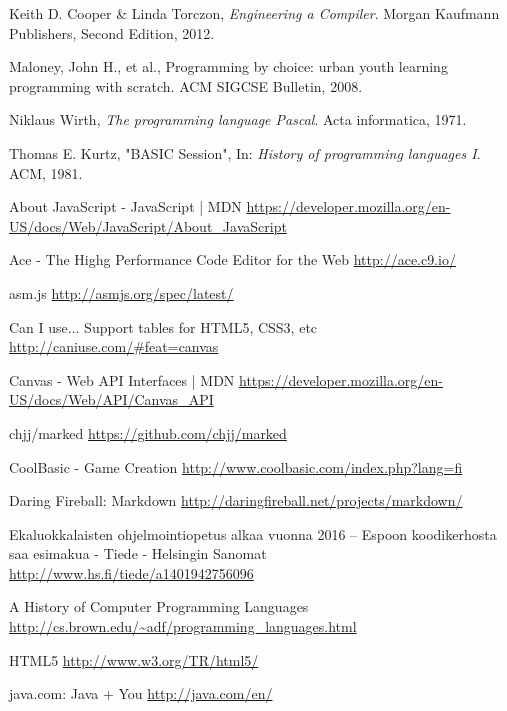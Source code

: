 
\begin{thebibliography}{99}

	Keith D. Cooper \& Linda Torczon,
	\emph{Engineering a Compiler}.
	Morgan Kaufmann Publishers,
	Second Edition,
	2012.

	Maloney, John H., et al.,
	Programming by choice: urban youth learning programming with scratch.
	ACM SIGCSE Bulletin,
	2008.
	
	Niklaus Wirth,
	\emph{The programming language Pascal}.
	Acta informatica,
	1971.

	Thomas E. Kurtz,
	"BASIC Session",
	In: \emph{History of programming languages I}.
	ACM,
	1981.

	
	About JavaScript - JavaScript | MDN \url{https://developer.mozilla.org/en-US/docs/Web/JavaScript/About_JavaScript}
	
	Ace - The Highg Performance Code Editor for the Web \url{http://ace.c9.io/}

	asm.js \url{http://asmjs.org/spec/latest/}
	
	Can I use... Support tables for HTML5, CSS3, etc \url{http://caniuse.com/#feat=canvas}
	
	Canvas - Web API Interfaces | MDN \url{https://developer.mozilla.org/en-US/docs/Web/API/Canvas_API}

	chjj/marked \url{https://github.com/chjj/marked}
	
	CoolBasic - Game Creation \url{http://www.coolbasic.com/index.php?lang=fi}

	Daring Fireball: Markdown \url{http://daringfireball.net/projects/markdown/}
	
	Ekaluokkalaisten ohjelmointiopetus alkaa vuonna 2016 – Espoon koodikerhosta saa esimakua - Tiede - Helsingin Sanomat \url{http://www.hs.fi/tiede/a1401942756096}
	
	A History of Computer Programming Languages \url{http://cs.brown.edu/~adf/programming_languages.html}
	
	HTML5 \url{http://www.w3.org/TR/html5/}
	
	java.com: Java + You \url{http://java.com/en/}
	

\end{thebibliography}
